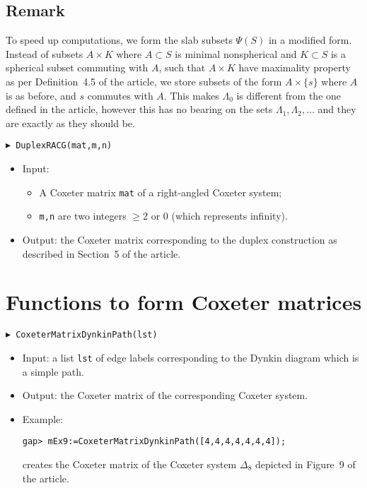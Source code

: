 \documentclass[10pt]{amsart}
\begin{document}
\subsection*{Remark} To speed up computations, we form the slab subsets $\Psi(S)$ in a modified form. Instead of subsets $A\times K$ where $A\subset S$ is minimal nonspherical and $K\subset S$ is a spherical subset commuting with $A$, such that $A\times K$ have maximality property as per Definition~4.5 of the article, we store subsets of the form $A\times\{s\}$ where $A$ is as before, and $s$ commutes with $A$. This makes $\Lambda_0$ is different from the one defined in the article, however this has no bearing on the sets $\Lambda_1,\Lambda_2,\dots$ and they are exactly as they should be.

\bigskip\noindent
{\tt $\blacktriangleright$ DuplexRACG(mat,m,n)}
\noindent 
\begin{itemize}
\item{} Input: 
	\begin{itemize}
	\item A Coxeter matrix {\tt mat} of a right-angled Coxeter system;
	\item {\tt m,n} are two integers $\ge 2$ or $0$ (which represents infinity).
	\end{itemize}
\item{} Output: the Coxeter matrix corresponding to the duplex construction as described in Section~5 of the article.
\end{itemize}



\section{Functions to form Coxeter matrices}

\noindent
{\tt $\blacktriangleright$ CoxeterMatrixDynkinPath(lst)}
\noindent 
\begin{itemize}
\item{} Input: a list {\tt lst} of edge labels corresponding to the Dynkin diagram which is a simple path.
\item{} Output: the Coxeter matrix of the corresponding Coxeter system.
\item Example: 

\noindent
\verb+gap> mEx9:=CoxeterMatrixDynkinPath([4,4,4,4,4,4,4]);+

\noindent
creates the Coxeter matrix of the Coxeter system $\Delta_8$ depicted in Figure~9 of the article.
\end{itemize}
\end{document}
